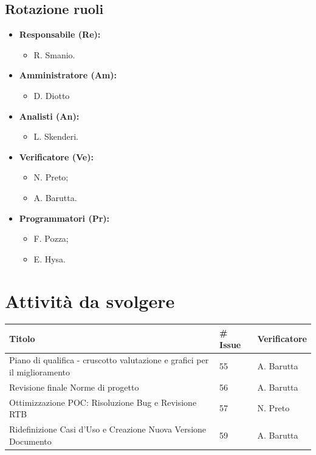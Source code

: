 \documentclass{article}
\begin{document}
    \subsection{Rotazione ruoli}
    \begin{itemize}
        \item \textbf{Responsabile (Re):}
              \begin{itemize}
                  \item R. Smanio.
              \end{itemize}
        \item \textbf{Amministratore (Am):}
              \begin{itemize}
                  \item D. Diotto
              \end{itemize}
        \item \textbf{Analisti (An):}
              \begin{itemize}
                  \item L. Skenderi.
              \end{itemize}
        \item \textbf{Verificatore (Ve):}
              \begin{itemize}
                  \item N. Preto;
                  \item A. Barutta.
              \end{itemize}
        \item \textbf{Programmatori (Pr):}
              \begin{itemize}
                  \item F. Pozza;
                  \item E. Hysa.
              \end{itemize}
    \end{itemize}
\section{Attività da svolgere}
    \begin{center}
        \begin{tabular}{|C{7cm}|C{1,5cm}|C{3cm}|}
            \hline
            \textbf{Titolo} & \textbf{\# Issue} & \textbf{Verificatore} \\
            \hline\hline           
            Piano di qualifica - cruscotto valutazione e grafici per il miglioramento  & 55 & A. Barutta \\
            
            Revisione finale Norme di progetto & 56 & A. Barutta \\
            
            Ottimizzazione POC: Risoluzione Bug e Revisione RTB & 57 & N. Preto \\

            Ridefinizione Casi d'Uso e Creazione Nuova Versione Documento & 59 & A. Barutta \\

            \hline
        \end{tabular}
    \end{center}
\end{document}
